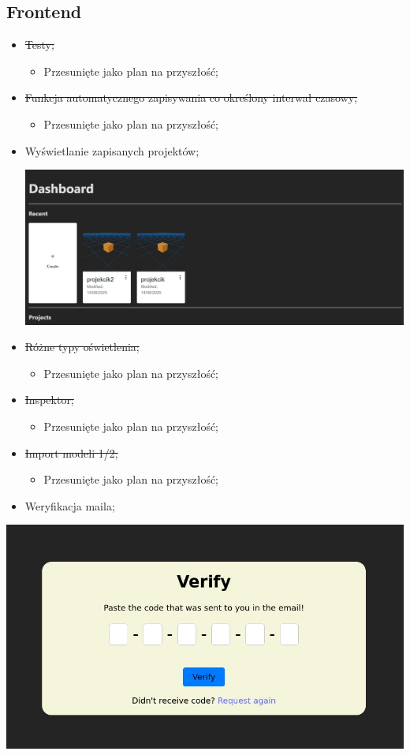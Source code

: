 \documentclass[11pt]{article}
\begin{document}
\subsection{Frontend}
\label{sec:orgd5bdaae}
\begin{itemize}
\item \sout{Testy;}
\begin{itemize}
\item Przesunięte jako plan na przyszłość;
\end{itemize}
\item \sout{Funkcja automatycznego zapisywania co określony interwał czasowy;}
\begin{itemize}
\item Przesunięte jako plan na przyszłość;
\end{itemize}
\item Wyświetlanie zapisanych projektów;
\begin{center}
\includegraphics[width=.9\linewidth]{./img/dashboard.jpg}
\end{center}
\item \sout{Różne typy oświetlenia;}
\begin{itemize}
\item Przesunięte jako plan na przyszłość;
\end{itemize}
\item \sout{Inspektor;}
\begin{itemize}
\item Przesunięte jako plan na przyszłość;
\end{itemize}
\item \sout{Import modeli 1/2;}
\begin{itemize}
\item Przesunięte jako plan na przyszłość;
\end{itemize}
\item Weryfikacja maila;
\end{itemize}
\begin{center}
\includegraphics[width=.9\linewidth]{./img/verify.jpg}
\end{center}
\end{document}
